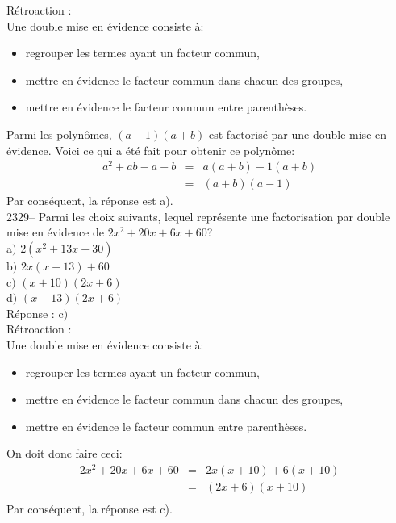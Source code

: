 \documentclass[letterpaper, 12pt]{article}
\begin{document}
R\'etroaction :\\
Une double mise en \'evidence consiste \`a:
\begin{itemize}
 \item regrouper les termes ayant un facteur commun,
\item mettre en \'evidence le facteur commun dans chacun des groupes,
\item mettre en \'evidence le facteur commun entre parenth\`eses.\\
\end{itemize}
Parmi les polyn\^omes, $(a-1)(a+b)$ est factoris\'e par une double mise en \'evidence. Voici ce qui a \'et\'e fait pour obtenir ce polyn\^ome:
\begin{eqnarray*}
a^{2}+ab-a-b &=& a(a+b)-1(a+b)\\
 &=& (a+b)(a-1)
\end{eqnarray*}
Par cons\'equent, la r\'eponse est a).\\

2329-- Parmi les choix suivants, lequel repr\'esente une factorisation par double mise en \'evidence de $2x^{2}+20x+6x+60$?\\

a$)$ $2(x^{2}+13x+30)$\\
b$)$ $2x(x+13)+60 $\\
c$)$ $(x+10)(2x+6)$\\
d$)$ $(x+13)(2x+6)$\\

R\'eponse : c$)$\\

R\'etroaction :\\
Une double mise en \'evidence consiste \`a:
\begin{itemize}
 \item regrouper les termes ayant un facteur commun,
\item mettre en \'evidence le facteur commun dans chacun des groupes,
\item mettre en \'evidence le facteur commun entre parenth\`eses.\\
\end{itemize}
On doit donc faire ceci:
\begin{eqnarray*}
 2x^{2}+20x+6x+60&=& 2x(x+10)+6(x+10)\\
 &=& (2x+6)(x+10)\\
\end{eqnarray*}
Par cons\'equent, la r\'eponse est c).\\
\end{document}
